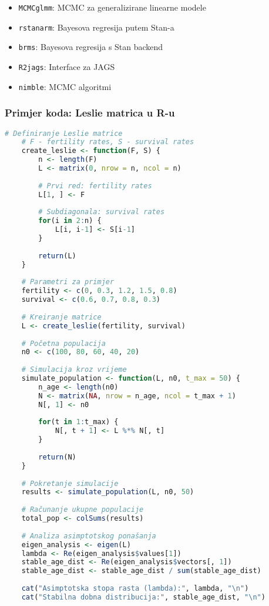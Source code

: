 \documentclass[11pt,oneside]{book}
\begin{document}
\begin{itemize}
	\item \texttt{MCMCglmm}: MCMC za generalizirane linearne modele
	\item \texttt{rstanarm}: Bayesova regresija putem Stan-a
	\item \texttt{brms}: Bayesova regresija s Stan backend
	\item \texttt{R2jags}: Interface za JAGS
	\item \texttt{nimble}: MCMC algoritmi
\end{itemize}

\subsubsection{Primjer koda: Leslie matrica u R-u}

\begin{lstlisting}[language=R, caption=Implementacija Leslie matrice]
	# Definiranje Leslie matrice
	# F - fertility rates, S - survival rates
	create_leslie <- function(F, S) {
		n <- length(F)
		L <- matrix(0, nrow = n, ncol = n)
		
		# Prvi red: fertility rates
		L[1, ] <- F
		
		# Subdiagonala: survival rates
		for(i in 2:n) {
			L[i, i-1] <- S[i-1]
		}
		
		return(L)
	}
	
	# Parametri za primjer
	fertility <- c(0, 0.3, 1.2, 1.5, 0.8)
	survival <- c(0.6, 0.7, 0.8, 0.3)
	
	# Kreiranje matrice
	L <- create_leslie(fertility, survival)
	
	# Početna populacija
	n0 <- c(100, 80, 60, 40, 20)
	
	# Simulacija kroz vrijeme
	simulate_population <- function(L, n0, t_max = 50) {
		n_age <- length(n0)
		N <- matrix(NA, nrow = n_age, ncol = t_max + 1)
		N[, 1] <- n0
		
		for(t in 1:t_max) {
			N[, t + 1] <- L %*% N[, t]
		}
		
		return(N)
	}
	
	# Pokretanje simulacije
	results <- simulate_population(L, n0, 50)
	
	# Računanje ukupne populacije
	total_pop <- colSums(results)
	
	# Analiza asimptotskog ponašanja
	eigen_analysis <- eigen(L)
	lambda <- Re(eigen_analysis$values[1])
	stable_age_dist <- Re(eigen_analysis$vectors[, 1])
	stable_age_dist <- stable_age_dist / sum(stable_age_dist)
	
	cat("Asimptotska stopa rasta (lambda):", lambda, "\n")
	cat("Stabilna dobna distribucija:", stable_age_dist, "\n")
\end{lstlisting}
\end{document}
